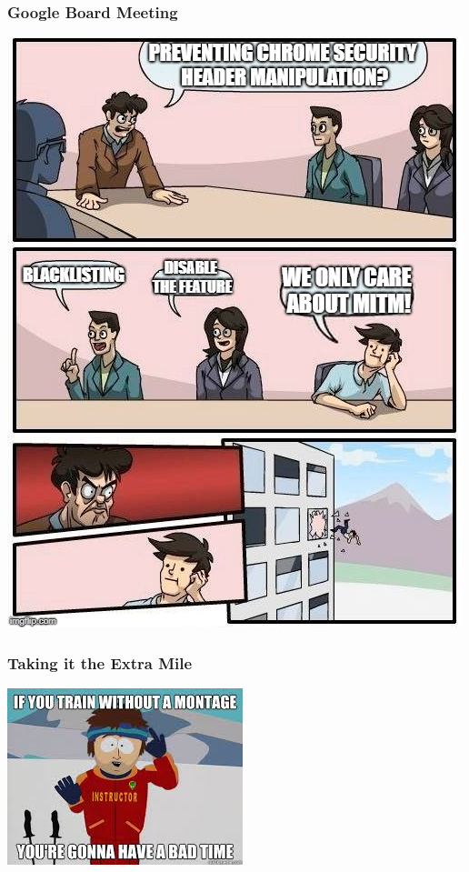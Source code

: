 \documentclass[aspectratio=169]{beamer}
\begin{document}
\begin{frame}
  \frametitle{Google Board Meeting}
  \begin{center}
    \includegraphics[scale=0.32]{out_the_window}
  \end{center}
\end{frame}
\begin{frame}
  \frametitle{Taking it the Extra Mile}
  \begin{center}
    \includegraphics[scale=0.5]{montage}
  \end{center}
\end{frame}
\end{document}
